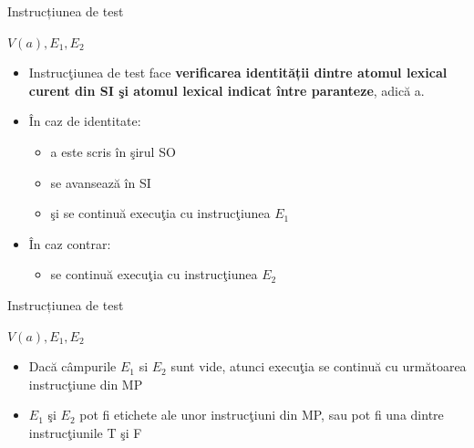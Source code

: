 \documentclass[pdf]{beamer}
\begin{document}
\begin{frame}{Instrucțiunea de test}

\begin{center}
$V(a), E_{1}, E_{2}$
\end{center}

\begin{itemize}
\item 
Instrucţiunea de test face \textbf{verificarea identității dintre atomul lexical curent din SI şi atomul lexical indicat între paranteze}, adică a. 

\item 
În caz de identitate:

\begin{itemize}
\item
a este scris în  şirul SO
\item
se avansează în SI 
\item
şi se continuă execuţia cu instrucţiunea $E_{1}$
\end{itemize}

\item 
În caz contrar:
\begin{itemize}
\item
se continuă execuţia cu instrucţiunea $E_{2}$
\end{itemize}
\end{itemize}
\end{frame}



\begin{frame}{Instrucțiunea de test}

\begin{center}
$V(a), E_{1}, E_{2}$
\end{center}

\begin{itemize}
\item 
Dacă câmpurile $E_{1}$ si $E_{2}$ sunt vide, atunci execuţia se continuă cu următoarea instrucţiune din MP

\item 
$E_{1}$ şi $E_{2}$ pot fi etichete ale unor instrucţiuni din MP, sau pot fi una dintre instrucţiunile T şi F
\end{itemize}
\end{frame}
\end{document}
